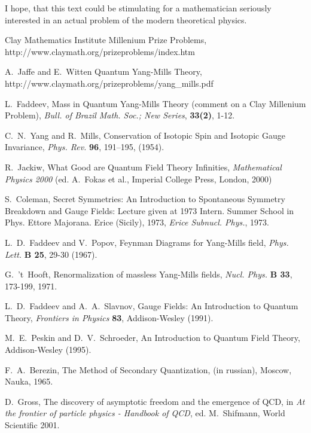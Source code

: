 \documentclass[12pt]{article}
\begin{document}
	I hope, that this text could be stimulating for a mathematician
	seriously interested in an actual problem of the modern
	theoretical physics.

\begin{thebibliography}{99}

        Clay Mathematics Institute Millenium Prize Problems,\\
        http://www.claymath.org/prizeproblems/index.htm

        A.~Jaffe and E.~Witten Quantum Yang-Mills Theory,\\
        http://www.claymath.org/prizeproblems/yang\_mills.pdf

	L.~Faddeev, Mass in Quantum Yang-Mills Theory
	(comment on a Clay Millenium Problem),
	{\it Bull. of Brazil Math. Soc.; New Series}, {\bf 33(2)}, 1-12.

        C.~N.~Yang and R.~Mills, Conservation of Isotopic Spin and
        Isotopic Gauge Invariance, {\it Phys. Rev.} {\bf 96}, 191--195,
        (1954).

        R.~Jackiw, What Good are Quantum Field Theory Infinities,
        {\it Mathematical Physics 2000}
        (ed. A.~Fokas et al., Imperial College Press, London, 2000)

        S.~Coleman, Secret Symmetries: An Introduction to Spontaneous
        Symmetry Breakdown and Gauge Fields: Lecture given at 1973
        Intern. Summer School in Phys. Ettore Majorana. Erice (Sicily),
        1973, {\it Erice Subnucl. Phys.}, 1973.

	L.~D.~Faddeev and V.~Popov, Feynman Diagrams for Yang-Mills
	field, {\it Phys. Lett.} {\bf B 25}, 29-30 (1967).

	G.~'t~Hooft, Renormalization of massless Yang-Mills fields,
	{\it Nucl. Phys.} {\bf B 33}, 173-199, 1971.

        L.~D.~Faddeev and A.~A.~Slavnov, Gauge Fields: An Introduction
	to Quantum Theory, {\it Frontiers in Physics} {\bf 83},
	Addison-Wesley (1991).

        M.~E.~Peskin and D.~V.~Schroeder, An Introduction to
        Quantum Field Theory, Addison-Wesley (1995).

        F.~A.~Berezin, The Method of Secondary Quantization,
	(in russian), Moscow, Nauka, 1965.

	D.~Gross, The discovery of asymptotic freedom and the emergence
	of QCD, in {\it At the frontier of particle physics - Handbook
	of QCD}, ed. M.~Shifmann, World Scientific 2001.


\end{thebibliography}
\end{document}
